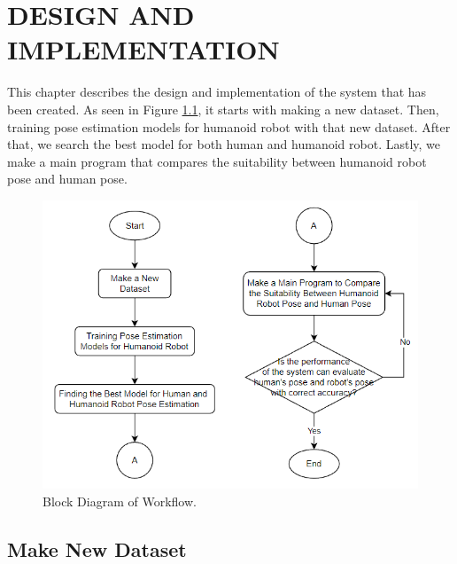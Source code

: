 \chapter{DESIGN AND IMPLEMENTATION}
\label{chap:desainandimplementation}


This chapter describes the design and implementation of the system that has been created.
As seen in Figure \ref{fig:block-diagram}, it starts with making a new dataset. Then, training pose estimation models for humanoid robot with that new dataset.
After that, we search the best model for both human and humanoid robot. Lastly, we make a main program that compares the suitability between humanoid robot pose and human pose.

\begin{figure}[ht]
  \centering
  \includegraphics[scale=1.1]{gambar/diagram-block.png}
  \caption{Block Diagram of Workflow.}
  \label{fig:block-diagram}
\end{figure}

\section{Make New Dataset}
\label{sec:makenewdataset}

